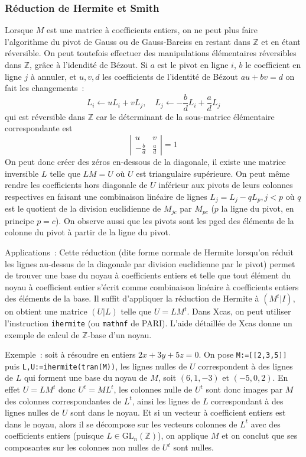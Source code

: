 \documentclass[a4paper,11pt]{article}
\begin{document}
\begin{giacjshere}
\subsubsection{R\'eduction de Hermite et Smith} 
Lorsque $M$ est une matrice \`a coefficients entiers, 
on ne peut plus faire l'algorithme du pivot de Gauss ou de
Gauss-Bareiss en restant dans $\mathbb{Z}$ et en \'etant r\'eversible.
On peut toutefois effectuer des manipulations \'el\'ementaires
r\'eversibles dans $\mathbb{Z}$, gr\^ace \`a l'idendit\'e de B\'ezout. Si $a$
est le pivot en ligne $i$, $b$ le coefficient en ligne $j$ \`a
annuler, et $u, v, d$ les coefficients de l'identit\'e de B\'ezout
$a u + b v =d$ on fait les changements~:
\[ L_i \leftarrow uL_i +v L_j, \quad 
L_j \leftarrow -\frac{b}{d} L_i + \frac{a}{d} L_j \]
qui est r\'eversible dans $\mathbb{Z}$
car le d\'eterminant de la sous-matrice \'el\'ementaire
correspondante est
\[ \left| \begin{array}{cc}
u & v \\
-\frac{b}{d} & \frac{a}{d}
\end{array} \right| = 1
\]
On peut donc cr\'eer des z\'eros en-dessous de la diagonale, il existe
une matrice inversible $L$ telle que $LM=U$ o\`u $U$ est triangulaire
sup\'erieure. On peut m\^eme rendre les coefficients hors diagonale
de $U$ inf\'erieur aux pivots de leurs colonnes respectives en faisant
une combinaison lin\'eaire de lignes $L_j = L_j-qL_p, j<p$ o\`u $q$
est le quotient de la division euclidienne de $M_{jc}$ par $M_{pc}$
($p$ la ligne du pivot, en principe $p=c$).
On observe aussi que les pivots sont les pgcd des \'el\'ements de la colonne
du pivot \`a partir de la ligne du pivot.

Applications~: 
Cette r\'eduction (dite forme normale de Hermite 
lorsqu'on r\'eduit les lignes
au-dessus de la diagonale par division euclidienne par
le pivot) permet de trouver une base du noyau
\`a coefficients entiers et telle que tout \'el\'ement du noyau \`a 
coefficient entier s'\'ecrit comme combinaison lin\'eaire \`a coefficients
entiers des \'el\'ements de la base. Il suffit d'appliquer la
r\'eduction de Hermite \`a $(M^t|I)$, on obtient une matrice $(U|L)$
telle que $U=LM^t$.
Dans Xcas, on peut utiliser l'instruction \verb|ihermite| (ou
\verb|mathnf| de PARI). L'aide
d\'etaill\'ee de Xcas donne un exemple de calcul de $\mathbb{Z}$-base
d'un noyau. 

Exemple~: soit \`a r\'esoudre en entiers $2x+3y+5z=0$.
On pose \verb|M:=[[2,3,5]]| puis 
\verb|L,U:=ihermite(tran(M))|, les lignes nulles de $U$ correspondent
\`a des lignes de $L$ qui forment une base du noyau de $M$, soit
$(6,1,-3)$ et $(-5,0,2)$.
En effet $U=L M^t$ donc $U^t=M L^t$, les colonnes nulle 
de $U^t$ sont donc images par $M$ des colonnes
correspondantes de $L^t$, ainsi les lignes de $L$ correspondant
\`a des lignes nulles de $U$ sont dans le noyau. Et si un vecteur
\`a coefficient entiers est dans le noyau, alors il se d\'ecompose
sur les vecteurs colonnes de $L^t$ avec des coefficients entiers
(puisque $L\in$GL$_n(\mathbb{Z})$), on applique $M$ et on conclut
que ses composantes sur les colonnes non nulles de $U^t$ sont nulles.


\end{giacjshere}
\end{document}

